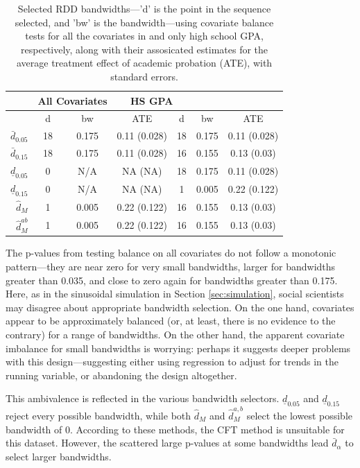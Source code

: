 \documentclass[12pt]{article}\usepackage[]{graphicx}\usepackage[]{color}
\newcommand{\dalphaU}{\bar{d}_\alpha}
\newcommand{\dhat}{\hat{d}}
\newcommand{\dhatB}{\underline{d}}
\newcommand{\dhatm}{\hat{d}_M}
\newcommand{\dhatmab}{\hat{d}^{ab}_M}
\begin{document}
\begin{table}[ht]
\centering
\begin{tabular}{r|ccc|ccc|}
  & \multicolumn{2}{c}{All Covariates}&\multicolumn{2}{c}{HS GPA}\\
 \hline
 & d & bw & ATE & d & bw & ATE \\ 
  \hline
$\bar{d}_{0.05}$ & 18 & 0.175 & 0.11 (0.028) & 18 & 0.175 & 0.11 (0.028) \\ 
  $\bar{d}_{0.15}$ & 18 & 0.175 & 0.11 (0.028) & 16 & 0.155 & 0.13 (0.03) \\ 
  $\underline{d}_{0.05}$ & 0 & N/A & NA (NA) & 18 & 0.175 & 0.11 (0.028) \\ 
  $\underline{d}_{0.15}$ & 0 & N/A & NA (NA) & 1 & 0.005 & 0.22 (0.122) \\ 
  $\dhatm$ & 1 & 0.005 & 0.22 (0.122) & 16 & 0.155 & 0.13 (0.03) \\ 
  $\dhatmab$ & 1 & 0.005 & 0.22 (0.122) & 16 & 0.155 & 0.13 (0.03) \\ 
   \hline
\end{tabular}
\caption{Selected RDD bandwidths---'d' is the point in the sequence selected, and 'bw' is the bandwidth---using covariate balance tests for all the covariates in \citet{lso} and only high school GPA, respectively, along with their assosicated estimates for the average treatment effect of academic probation (ATE), with standard errors.} 
\label{tab:RDD}
\end{table}


The p-values from testing balance on all covariates do not follow a
monotonic pattern---they are near zero for very small bandwidths,
larger for bandwidths greater than 0.035, and close to zero again for
bandwidths greater than 0.175.
Here, as in the sinusoidal simulation in Section \ref{sec:simulation},
social scientists may disagree about appropriate bandwidth selection.
On the one hand, covariates appear to be approximately balanced (or,
at least, there is no evidence to the contrary) for a range of
bandwidths.
On the other hand, the apparent covariate imbalance for small
bandwidths is worrying: perhaps it suggests deeper problems with this
design---suggesting either using regression to adjust for trends in
the running variable, or abandoning the design altogether.

This ambivalence is reflected in the various bandwidth selectors.
$\dhatB_{0.05}$ and $\dhatB_{0.15}$ reject every possible bandwidth, while
both $\dhatm$ and $\dhat_M^{a,b}$ select the lowest possible
bandwidth of 0.
According to these methods, the CFT method is unsuitable for this
dataset.
However, the scattered large p-values at some bandwidths lead
 $\dalphaU$ to select larger bandwidths.
\end{document}
